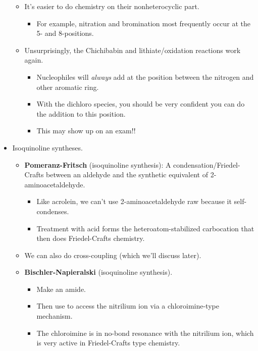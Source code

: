 \documentclass[../notes.tex]{subfiles}
\begin{document}
\begin{itemize}
    \begin{itemize}
        \item It's easier to do chemistry on their nonheterocyclic part.
        \begin{itemize}
            \item For example, nitration and bromination most frequently occur at the 5- and 8-positions.
        \end{itemize}
        \item Unsurprisingly, the Chichibabin and lithiate/oxidation reactions work again.
        \begin{itemize}
            \item Nucleophiles will \emph{always} add at the position between the nitrogen and other aromatic ring.
            \item With the dichloro species, you should be very confident you can do the addition to this position.
            \item This may show up on an exam!!
        \end{itemize}
    \end{itemize}
    \item Isoquinoline syntheses.
    \begin{itemize}
        \item \textbf{Pomeranz-Fritsch} (isoquinoline synthesis): A condensation/Friedel-Crafts between an aldehyde and the synthetic equivalent of 2-aminoacetaldehyde.
        \begin{itemize}
            \item Like acrolein, we can't use 2-aminoacetaldehyde raw because it self-condenses.
            \item Treatment with acid forms the heteroatom-stabilized carbocation that then does Friedel-Crafts chemistry.
        \end{itemize}
        \item We can also do  cross-coupling (which we'll discuss later).
        \item \textbf{Bischler-Napieralski} (isoquinoline synthesis).
        \begin{itemize}
            \item Make an amide.
            \item Then use  to access the nitrilium ion via a chloroimine-type mechanism.
            \item The chloroimine is in no-bond resonance with the nitrilium ion, which is very active in Friedel-Crafts type chemistry.

\end{itemize}
\end{itemize}
\end{itemize}
\end{document}
